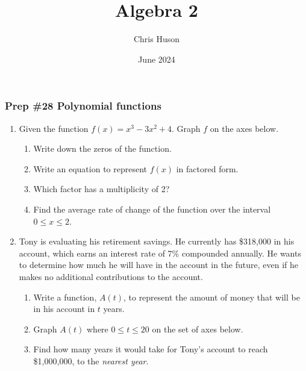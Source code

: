 \documentclass[12pt, twoside]{article}
\title{Algebra 2}
\author{Chris Huson}
\date{June 2024}
\begin{document}
\subsubsection*{Prep \#28 Polynomial functions}
\begin{enumerate}
\item Given the function $f(x)=x^3-3x^2+4$. Graph $f$ on the axes below.
    \begin{enumerate}[itemsep=1.5cm]
        \item Write down the zeros of the function.
        \item Write an equation to represent $f(x)$ in factored form.
        \item Which factor has a multiplicity of 2?
        \item Find the average rate of change of the function over the interval $0 \leq x \leq 2$.
    \end{enumerate} \vspace{2cm}
    \begin{center}
        \end{center}

\newpage
\item Tony is evaluating his retirement savings. He currently has \$318,000 in his account, which earns an interest rate of 7\% compounded annually. He wants to determine how much he will have in the account in the future, even if he makes no additional contributions to the account.
    \begin{enumerate}
        \item Write a function, \( A(t) \), to represent the amount of money that will be in his account in \( t \) years. \vspace{1.cm}
        \item Graph \( A(t) \) where \( 0 \leq t \leq 20 \) on the set of axes below.
        \item Find how many years it would take for Tony's account to reach \$1,000,000, to the \emph{nearest year}. \vspace{1.5cm}
    \end{enumerate}
    \begin{center}
    \end{center}

    
\end{enumerate}
\end{document}
